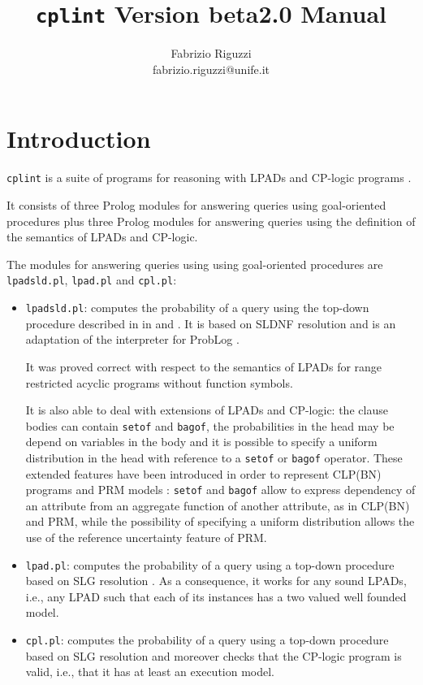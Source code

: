 \documentclass[a4paper,12pt]{article}
\begin{document}
\title{\texttt{cplint} Version beta2.0 Manual}


\author{Fabrizio Riguzzi\\
fabrizio.riguzzi@unife.it}

\maketitle


\section{Introduction}


\texttt{cplint} is a suite of programs for reasoning with LPADs \cite{VenVer03-TR,VenVer04-ICLP04-IC} and CP-logic programs \cite{VenDenBru-JELIA06,CP-logic-unp}. 

It consists of three Prolog modules  for answering queries using goal-oriented procedures plus
 three
Prolog modules for answering queries using the definition of the semantics of LPADs and CP-logic.

The modules for answering queries using using goal-oriented procedures are \texttt{lpadsld.pl}, \texttt{lpad.pl} and
\texttt{cpl.pl}:
\begin{itemize}
\item \texttt{lpadsld.pl}: computes the probability of a query using the top-down procedure described in 
in \cite{Rig-AIIA07-IC} and \cite{Rig-RCRA07-IC}. It is based on SLDNF resolution and is an adaptation of the interpreter for ProbLog \cite{DBLP:conf/ijcai/RaedtKT07}.

It was proved correct \cite{Rig-RCRA07-IC} with respect to the semantics of LPADs for range restricted acyclic programs \cite{DBLP:journals/ngc/AptB91} without function symbols.

It is also able to deal with extensions of LPADs and CP-logic: the clause bodies can contain \texttt{setof} and \texttt{bagof}, the probabilities in the head may be depend on variables in the body and it is possible to specify a uniform distribution in the head with reference to a \texttt{setof} or \texttt{bagof} operator. These extended features have been introduced in order to represent CLP(BN) \cite{SanPagQaz03-UAI-IC} programs and PRM models \cite{Getoor+al:JMLR02}:
\texttt{setof} and \texttt{bagof} allow to express dependency of an attribute from an aggregate function of another attribute, as in CLP(BN)  and PRM, while the possibility of specifying a uniform distribution allows the use of the reference uncertainty feature of PRM.
\item \texttt{lpad.pl}: computes the probability of a query using a top-down procedure based on SLG resolution \cite{DBLP:journals/jacm/ChenW96}. As a consequence, it works for any sound LPADs, i.e., any LPAD such that each of its instances has a two valued well founded model. 
\item \texttt{cpl.pl}: computes the probability of a query using a top-down procedure based on SLG resolution and moreover checks that the CP-logic program is valid, i.e., that it has at least an execution model.
\end{itemize}
\end{document}
